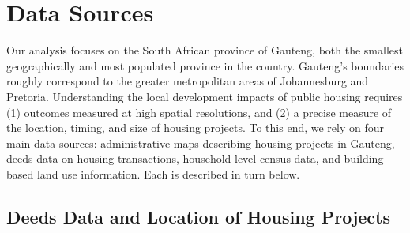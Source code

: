\documentclass[12pt]{article}
\begin{document}




\section{Data Sources}\label{section:data}

Our analysis focuses on the South African province of Gauteng, both the smallest geographically and most populated province in the country. Gauteng's boundaries roughly correspond to the greater metropolitan areas of Johannesburg and Pretoria. Understanding the local development impacts of public housing requires (1) outcomes measured at high spatial resolutions, and (2) a precise measure of the location, timing, and size of housing projects.  To this end, we rely on four main data sources: administrative maps describing housing projects in Gauteng, deeds data on housing transactions, household-level census data, and building-based land use information. Each is described in turn below.

\subsection{Deeds Data and Location of Housing Projects}
\end{document}
